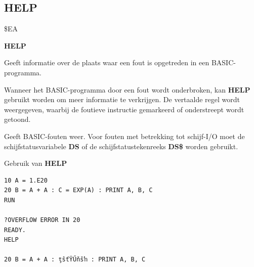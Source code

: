 
\newpage
\subsection{HELP}
\begin{description}[leftmargin=2cm,style=nextline]
\item [Token:]    \$EA

\item [Formaat:]   {\bf HELP}

\item [Gebruik:]    Geeft informatie over de plaats waar een fout is opgetreden in een BASIC-programma.

                  Wanneer het BASIC-programma door een fout wordt onderbroken, kan {\bf HELP} gebruikt worden om meer informatie te verkrijgen. De vertaalde regel wordt weergegeven, waarbij de foutieve instructie gemarkeerd of onderstreept wordt getoond.

\item [Opmerkingen:]  Geeft BASIC-fouten weer. Voor fouten met betrekking tot schijf-I/O moet de schijfstatusvariabele {\bf DS} of de schijfstatustekenreeks {\bf DS\$} worden gebruikt.

\item [Voorbeeld:]  Gebruik van {\bf HELP}

\begin{tcolorbox}[colback=black,coltext=white]
\verbatimfont{\codefont}
\begin{verbatim}
10 A = 1.E20
20 B = A + A : C = EXP(A) : PRINT A, B, C
RUN

?OVERFLOW ERROR IN 20
READY.
HELP

20 B = A + A : ţŝťŸŰňšŉ : PRINT A, B, C
\end{verbatim}
\end{tcolorbox}
\end{description}


\newpage
